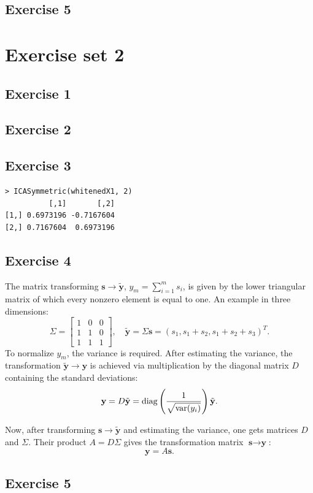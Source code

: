 \documentclass{article}
\begin{document}
\subsection{Exercise 5}

\section{Exercise set 2}

\subsection{Exercise 1}
\subsection{Exercise 2}
\subsection{Exercise 3}
\begin{verbatim}
> ICASymmetric(whitenedX1, 2)
          [,1]       [,2]
[1,] 0.6973196 -0.7167604
[2,] 0.7167604  0.6973196
\end{verbatim}
\subsection{Exercise 4}
The matrix transforming $\textbf{s} \to \tilde{\textbf{y}}$, $y_m = \sum_{i=1}^m s_i$, is given by
the lower triangular matrix of which every nonzero element is equal to
one. An example in three dimensions:
\[
\Sigma =
\left[ \begin{array}{ccc}
1 & 0 & 0 \\
1 & 1 & 0 \\
1 & 1 & 1 \end{array} \right],
\quad
\tilde{\textbf{y}} = \Sigma \textbf{s} = (s_1, s_1 + s_2, s_1 + s_2 + s_3)^T.
\]
To normalize $y_m$, the variance is required. After estimating
the variance, the transformation $\tilde{\textbf{y}} \to \textbf{y}$
is achieved via multiplication by the diagonal matrix $D$ containing the
standard deviations: 
\[
\textbf{y} = D \tilde{\textbf{y}}= \textup{diag} \left( \frac{1}{\sqrt{\textup{var}(y_i)}}
\right) \tilde{\textbf{y}}.
\]

Now, after transforming $\textbf{s} \to \tilde{\textbf{y}}$ and
estimating the variance, one gets matrices $D$ and $\Sigma$. Their
product $A = D \Sigma$ gives the transformation matrix $\textbf{s} \to
\textbf{y}$:
\[
\textbf{y} = A\textbf{s}.
\]
\subsection{Exercise 5}
\end{document}
